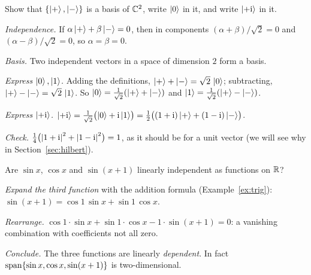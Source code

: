 \begin{example}\label{ex:qubit-bases}
  Show that $\{\left|+\right\rangle,\left|-\right\rangle\}$ is a basis of $\mathbb{C}^2$, write $\left|0\right\rangle$ in it, and write $\left|+\mathrm{i}\right\rangle$ in it.
\end{example}
\begin{solution}
  \begin{steps}
    \item \emph{Independence.} If $\alpha\left|+\right\rangle+\beta\left|-\right\rangle=0$, then in components $(\alpha+\beta)/\sqrt2=0$ and $(\alpha-\beta)/\sqrt2=0$, so $\alpha=\beta=0$.
    \item \emph{Basis.} Two independent vectors in a space of dimension $2$ form a basis.
    \item \emph{Express $\left|0\right\rangle,\left|1\right\rangle$.} Adding the definitions, $\left|+\right\rangle+\left|-\right\rangle=\sqrt2\,\left|0\right\rangle$; subtracting, $\left|+\right\rangle-\left|-\right\rangle=\sqrt2\,\left|1\right\rangle$. So $\left|0\right\rangle=\tfrac1{\sqrt2}(\left|+\right\rangle+\left|-\right\rangle)$ and $\left|1\right\rangle=\tfrac1{\sqrt2}(\left|+\right\rangle-\left|-\right\rangle)$.
    \item \emph{Express $\left|+\mathrm{i}\right\rangle$.} $\left|+\mathrm{i}\right\rangle=\tfrac1{\sqrt2}\bigl(\left|0\right\rangle+\mathrm{i}\left|1\right\rangle\bigr)=\tfrac12\bigl((1+\mathrm{i})\left|+\right\rangle+(1-\mathrm{i})\left|-\right\rangle\bigr)$.
    \item \emph{Check.} $\tfrac14\bigl(\left|1+\mathrm{i}\right|^2+\left|1-\mathrm{i}\right|^2\bigr)=1$, as it should be for a unit vector (we will see why in Section~\ref{sec:hilbert}).
  \end{steps}
\end{solution}

\begin{example}\label{ex:dependent-functions}
  Are $\sin x$, $\cos x$ and $\sin(x+1)$ linearly independent as functions on $\mathbb{R}$?
\end{example}
\begin{solution}
  \begin{steps}
    \item \emph{Expand the third function} with the addition formula (Example~\ref{ex:trig}): $\sin(x+1)=\cos1\,\sin x+\sin1\,\cos x$.
    \item \emph{Rearrange.} $\cos1\cdot\sin x+\sin1\cdot\cos x-1\cdot\sin(x+1)=0$: a vanishing combination with coefficients not all zero.
    \item \emph{Conclude.} The three functions are linearly \emph{dependent}. In fact $\operatorname{span}\{\sin x,\cos x,\sin(x+1)\}$ is two-dimensional.
  \end{steps}
\end{solution}

